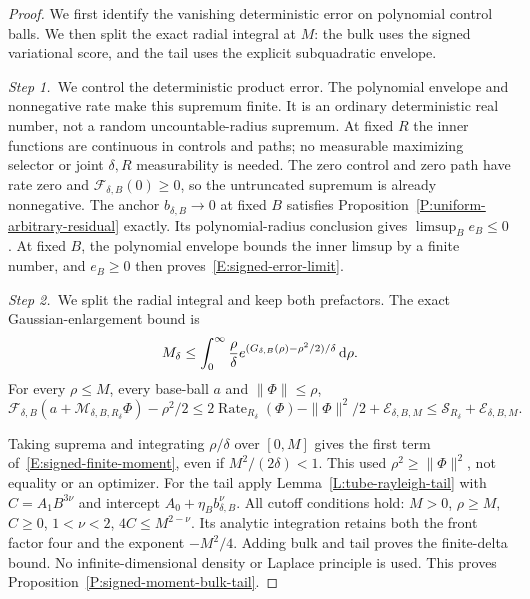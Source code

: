 \begin{proof}
  We first identify the vanishing deterministic error on polynomial control
  balls. We then split the exact radial integral at $M$: the bulk uses the
  signed variational score, and the tail uses the explicit subquadratic
  envelope.


  \medskip
  \noindent\textit{Step 1.~}We control the deterministic product error.
  The polynomial envelope and nonnegative rate make this supremum finite. It is
  an ordinary deterministic real number, not a random uncountable-radius
  supremum. At fixed $R$ the inner functions are continuous in controls and
  paths; no measurable maximizing selector or joint $\delta,R$ measurability is
  needed. The zero control and zero path have rate zero and
  $\mathcal{F}_{\delta,B}(0) \ge 0$, so the untruncated supremum is already
  nonnegative. The anchor $b_{\delta,B} \to 0$ at fixed $B$ satisfies
  Proposition~\ref{P:uniform-arbitrary-residual} exactly. Its polynomial-radius
  conclusion gives $\limsup_B e_B \le 0$. At fixed $B$, the polynomial envelope
  bounds the inner limsup by a finite number, and $e_B \ge 0$ then
  proves~\eqref{E:signed-error-limit}.


  \medskip
  \noindent\textit{Step 2.~}We split the radial integral and keep both
  prefactors.
  The exact Gaussian-enlargement bound is
  \[
    M_\delta\le\int_0^\infty\frac{\rho}{\delta}
    e^{(G_{\delta,B}(\rho)-\rho^2/2)/\delta}\,\mathrm{d}\rho .
  \]
  For every $\rho \le M$, every base-ball $a$ and $\|\Phi\| \le \rho$,
  \[
    \mathcal{F}_{\delta,B}(a+\mathcal{M}_{\delta,B,R_\delta}\Phi)-\rho^2/2
    \le2\operatorname{Rate}_{R_\delta}(\Phi)-\|\Phi\|^2/2
    +\mathcal{E}_{\delta,B,M}
    \le\mathcal{S}_{R_\delta}+\mathcal{E}_{\delta,B,M}.
  \]

  Taking suprema and integrating $\rho/\delta$ over $[0,M]$ gives the first term
  of~\eqref{E:signed-finite-moment}, even if $M^2/(2\delta) < 1$. This used
  $\rho^2 \ge \|\Phi\|^2$, not equality or an optimizer. For the tail apply
  Lemma~\ref{L:tube-rayleigh-tail} with $C = A_1B^{3\nu}$ and intercept
  $A_0+\eta_Bb_{\delta,B}^\nu$. All cutoff conditions hold: $M > 0$, $\rho \ge
  M$, $C \ge 0$, $1 < \nu < 2$, $4C \le M^{2-\nu}$. Its analytic integration
  retains both the front factor four and the exponent $-M^2/4$. Adding bulk and
  tail proves the finite-delta bound. No infinite-dimensional density or Laplace
  principle is used. This proves Proposition~\ref{P:signed-moment-bulk-tail}.
\end{proof}

